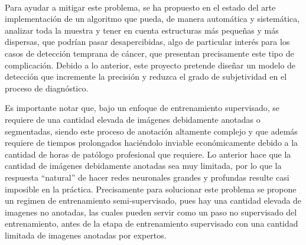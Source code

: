 \documentclass[12pt,letterpaper,final, openany]{scrbook}
\begin{document}
\\
Para ayudar a mitigar este problema, se ha propuesto en el estado del arte implementación de un algoritmo que pueda, de manera automática y sistemática, analizar toda la muestra y tener en cuenta estructuras más pequeñas y más dispersas, que podrían pasar desapercibidas, algo de particular interés para los casos de detección temprana de cáncer, que presentan precisamente este tipo de complicación. Debido a lo anterior, este proyecto pretende diseñar un modelo de detección que incremente la precisión y reduzca el grado de subjetividad en el proceso de diagnóstico.


Es importante notar que, bajo un enfoque de entrenamiento supervisado, se requiere de una cantidad elevada de imágenes debidamente anotadas o segmentadas, siendo este proceso de anotación  altamente complejo y que además requiere de tiempos prolongados haciéndolo inviable económicamente debido a la cantidad de horas de patólogo profesional que requiere. Lo anterior hace que la cantidad de imágenes debidamente anotadas sea muy limitada, por lo que la respuesta “natural” de hacer redes neuronales grandes y profundas resulte casi imposible en la práctica. Precisamente para solucionar este problema se propone un regimen de entrenamiento semi-supervisado, pues hay una cantidad elevada de imagenes no anotadas, las cuales pueden servir como un paso no supervisado del entrenamiento, antes de la etapa de entrenamiento supervisado con una cantidad limitada de imagenes anotadas por expertos.
\\
\end{document}
